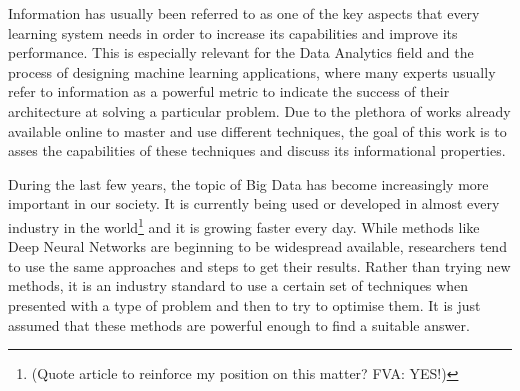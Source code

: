 Information has usually been referred to as one of the key aspects that every learning system needs in order to increase its capabilities and improve its performance. This is especially relevant for the Data Analytics field and the process of designing machine learning applications, where many experts usually refer to information as a powerful metric to indicate the success of their architecture at solving a particular problem. Due to the plethora of works already available online to master and use different techniques, the goal of this work is to asses the capabilities of these techniques and discuss its informational properties. 


During the last few years, the topic of Big Data has become increasingly more important in our society. It is currently being used or developed in almost every industry in the world\footnote{(Quote article to reinforce my position on this matter? {\color{red} FVA: YES!})} and it is growing faster every day. While methods like Deep Neural Networks are beginning to be widespread available,  researchers tend to use the same approaches and steps to get their results. Rather than trying new methods, it is an industry standard to use a certain set of techniques when presented with a type of problem and then to try to optimise them. It is just assumed that these methods are powerful enough to find a suitable answer. 


